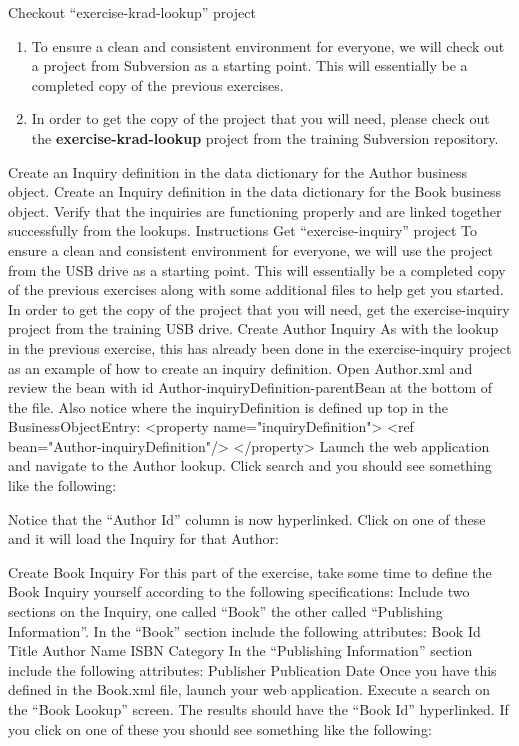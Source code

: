 \documentclass[xcolor=dvipsnames,14pt,professionalfonts]{beamer}
\begin{document}
\begin{frame}{Checkout “exercise-krad-lookup” project}
  \begin{enumerate}
    \item To ensure a clean and consistent environment for everyone, we will check out a project from Subversion as a starting point.  This will essentially be a completed copy of the previous exercises.
    \item In order to get the copy of the project that you will need,
      please check out the \textbf{exercise-krad-lookup} project from the
      training Subversion repository.
    \end{enumerate}
  \end{frame}
Create an Inquiry definition in the data dictionary for the Author business object.
Create an Inquiry definition in the data dictionary for the Book business object.
Verify that the inquiries are functioning properly and are linked together successfully from the lookups.
Instructions
Get “exercise-inquiry” project
To ensure a clean and consistent environment for everyone, we will use the project from the USB drive as a starting point. This will essentially be a completed copy of the previous exercises along with some additional files to help get you started.
In order to get the copy of the project that you will need, get the exercise-inquiry project from the training USB drive.
Create Author Inquiry
As with the lookup in the previous exercise, this has already been done in the exercise-inquiry project as an example of how to create an inquiry definition.
Open Author.xml and review the bean with id Author-inquiryDefinition-parentBean at the bottom of the file.
Also notice where the inquiryDefinition is defined up top in the BusinessObjectEntry:
<property name="inquiryDefinition">
  <ref bean="Author-inquiryDefinition"/>
</property>
Launch the web application and navigate to the Author lookup.
Click search and you should see something like the following:

Notice that the “Author Id” column is now hyperlinked.  Click on one of these and it will load the Inquiry for that Author:

Create Book Inquiry
For this part of the exercise, take some time to define the Book Inquiry yourself according to the following specifications:
Include two sections on the Inquiry, one called “Book” the other called “Publishing Information”.
In the “Book” section include the following attributes:
Book Id
Title
Author Name
ISBN
Category
In the “Publishing Information” section include the following attributes:
Publisher
Publication Date
Once you have this defined in the Book.xml file, launch your web application.
Execute a search on the “Book Lookup” screen.
The results should have the “Book Id” hyperlinked.
If you click on one of these you should see something like the following:
\end{document}

